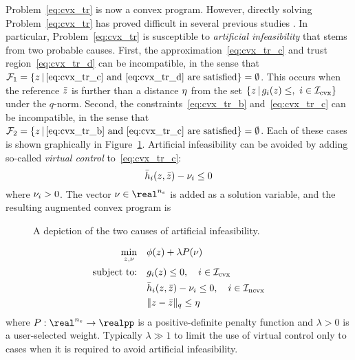 \documentclass[letterpaper, 10 pt, conference]{ieeeconf}
\begin{document}
Problem~\eqref{eq:cvx_tr} is now a convex program. However, directly solving Problem~\eqref{eq:cvx_tr} has proved difficult in several previous studies . In particular, Problem~\eqref{eq:cvx_tr} is susceptible to \textit{artificial infeasibility} that stems from two probable causes. First, the approximation~\eqref{eq:cvx_tr_c} and trust region~\eqref{eq:cvx_tr_d} can be incompatible, in the sense that $\mathcal{F}_1 = \{z\,|\,\eqref{eq:cvx_tr_c}\text{ and }\eqref{eq:cvx_tr_d}\text{ are satisfied}\} = \emptyset$. This occurs when the reference $\bar{z}$ is further than a distance $\eta$ from the set $\{z\,|\,g_i(z)\leq,~i\in\mathcal{I}_{\text{cvx}}\}$ under the $q$-norm. Second, the constraints~\eqref{eq:cvx_tr_b} and~\eqref{eq:cvx_tr_c} can be incompatible, in the sense that $\mathcal{F}_2 = \{z\,|\,\eqref{eq:cvx_tr_b}\text{ and }\eqref{eq:cvx_tr_c}\text{ are satisfied}\}=\emptyset$. Each of these cases is shown graphically in Figure~\ref{fig:artificial_infeas}. Artificial infeasibility can be avoided by adding so-called \textit{virtual control} to~\eqref{eq:cvx_tr_c}:
\begin{equation}
\bar{h}_i(z,\bar{z}) - \nu_i \leq 0
\end{equation}
where $\nu_i > 0$. The vector $\vc\in\real^{n_e}$ is added as a solution variable, and the resulting augmented convex program is%
\begin{figure}
\centering
\subfloat[$\mathcal{F}_1 = \emptyset$.]{} \hfil
\subfloat[$\mathcal{F}_2 = \emptyset$]{}
\caption{A depiction of the two causes of artificial infeasibility.}
\label{fig:artificial_infeas}
\end{figure}
\begin{subequations}\label{eq:cvx_apprx}
\begin{align}
\min_{z,\nu} &\quad \phi(z) + \lambda P(\nu) \label{eq:cvx_apprx_a} \\
\text{subject to:} &\quad g_i(z) \leq 0, \quad i\in\mathcal{I}_{\text{cvx}} \label{eq:cvx_apprx_b} \\
&\quad \bar{h}_i(z,\bar{z}) - \nu_i \leq 0, \quad i\in\mathcal{I}_{\text{ncvx}} \label{eq:cvx_apprx_c}\\
&\quad \|z-\bar{z}\|_q \leq \eta \label{eq:cvx_apprx_d}
\end{align}
\end{subequations}
where $P : \real^{n_e} \rightarrow \realpp$ is a positive-definite penalty function and $\lambda>0$ is a user-selected weight. Typically $\lambda \gg 1$ to limit the use of virtual control only to cases when it is required to avoid artificial infeasibility.
\end{document}
